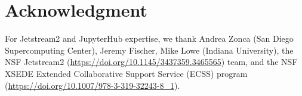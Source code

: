 \documentclass[conference]{IEEEtran}
\begin{document}
\section*{Acknowledgment}

For Jetstream2 and JupyterHub expertise, we thank Andrea Zonca (San Diego Supercomputing Center), Jeremy Fischer, Mike Lowe (Indiana University), the NSF Jetstream2 (\url{https://doi.org/10.1145/3437359.3465565}) team, and the NSF XSEDE Extended Collaborative Support Service (ECSS) program (\url{https://doi.org/10.1007/978-3-319-32243-8_1}).
\end{document}
